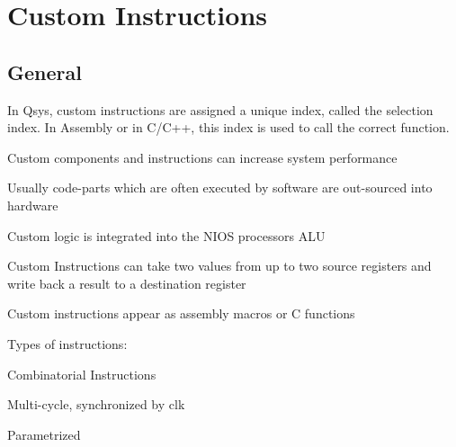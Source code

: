\section{Custom Instructions  }
	
	\subsection{General}
		In Qsys, custom instructions are assigned a unique index, called the selection index. In Assembly or in C/C++, this index is used to call the correct function. \\
		\begin{minipage}[H]{0.8\textwidth}
			\begin{compactitem}
				\item Custom components and instructions can increase system performance
				\item Usually code-parts which are often executed by software are out-sourced into hardware
				\item Custom logic is integrated into the NIOS processors ALU
				\item Custom Instructions can take two values from up to two source registers and write back a result to a destination register
				\item Custom instructions appear as assembly macros or C functions
				\item Types of instructions:
				\begin{compactitem}
					\item Combinatorial Instructions
					\item Multi-cycle, synchronized by clk
					\item Parametrized
				\end{compactitem}
			\end{compactitem}
		\end{minipage}
